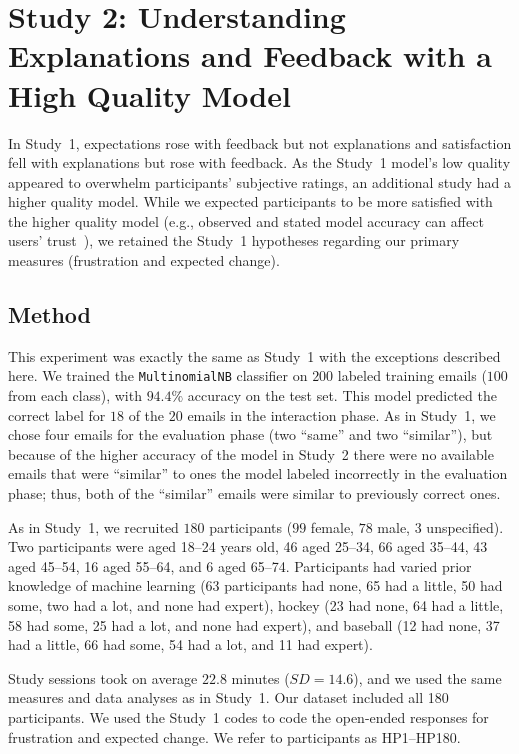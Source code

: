 \section{Study 2: Understanding Explanations and Feedback with a High Quality Model}
%
In Study~1, expectations rose with feedback but not explanations and satisfaction fell with explanations but rose with feedback.
%
As the Study~1 model's low quality appeared to overwhelm participants' subjective ratings, an additional study had a higher quality model. While we expected participants to be more satisfied with the higher quality model (e.g., observed and stated model accuracy can affect users' trust~\cite{Yin2019UnderstandingModels}), we retained the Study~1 hypotheses regarding our primary measures (frustration and expected change).

\subsection{Method}
This experiment was exactly the same as Study~1 with the exceptions described here. We trained the \texttt{MultinomialNB} classifier on $200$ labeled training emails ($100$ from each class), with $94.4\%$ accuracy on the test set. This model predicted the correct label for $18$ of the $20$ emails in the interaction phase. As in Study~1, we chose four emails for the evaluation phase (two ``same'' and two ``similar''), but because of the higher accuracy of the model in Study~2 there were no available emails that were ``similar'' to ones the model labeled incorrectly in the evaluation phase; thus, both of the ``similar'' emails were similar to previously correct ones. 

As in Study~1, we recruited $180$ participants ($99$ female, $78$ male, $3$ unspecified). Two participants were aged 18--24 years old, 46 aged 25--34, 66 aged 35--44, 43 aged 45--54, 16 aged 55--64, and 6 aged 65--74. Participants had varied prior knowledge of machine learning (63 participants had none, 65 had a little, 50 had some, two had a lot, and none had expert), hockey (23 had none, 64 had a little, 58 had some, 25 had a lot, and none had expert), and baseball (12 had none, 37 had a little, 66 had some, 54 had a lot, and 11 had expert).

Study sessions took on average $22.8$ minutes ($SD=14.6$), and we used the same measures and data analyses as in Study~1. Our dataset included all 180 participants. We used the Study~1 codes to code the open-ended responses for frustration and expected change. We refer to participants as HP1--HP180.

